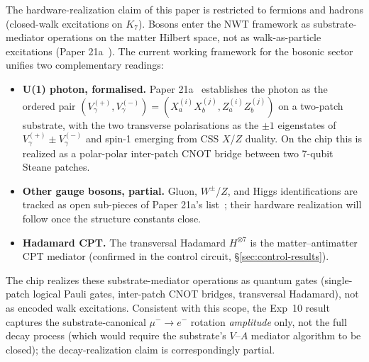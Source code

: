 \documentclass[11pt]{article}
\begin{document}
The hardware-realization claim of this paper is restricted to fermions and hadrons (closed-walk excitations on $K_7$).  Bosons enter the NWT framework as substrate-mediator operations on the matter Hilbert space, not as walk-as-particle excitations (Paper 21a~\cite[\S 3.6]{Paper21a}).  The current working framework for the bosonic sector unifies two complementary readings:
\begin{itemize}
\item \textbf{U(1) photon, formalised.}  Paper 21a~\cite[\S 3.6, \S 9.3]{Paper21a} establishes the photon as the ordered pair $(V_\gamma^{(+)}, V_\gamma^{(-)}) = (X_a^{(i)} X_b^{(j)}, Z_a^{(i)} Z_b^{(j)})$ on a two-patch substrate, with the two transverse polarisations as the $\pm 1$ eigenstates of $V_\gamma^{(+)} \pm V_\gamma^{(-)}$ and spin-1 emerging from CSS $X$/$Z$ duality.  On the chip this is realized as a polar-polar inter-patch CNOT bridge between two 7-qubit Steane patches.
\item \textbf{Other gauge bosons, partial.}  Gluon, $W^\pm$/$Z$, and Higgs identifications are tracked as open sub-pieces of Paper 21a's list~\cite[\S 9.3]{Paper21a}; their hardware realization will follow once the structure constants close.
\item \textbf{Hadamard CPT.}  The transversal Hadamard $H^{\otimes 7}$ is the matter--antimatter CPT mediator (confirmed in the control circuit, \S\ref{sec:control-results}).
\end{itemize}
The chip realizes these substrate-mediator operations as quantum gates (single-patch logical Pauli gates, inter-patch CNOT bridges, transversal Hadamard), not as encoded walk excitations.  Consistent with this scope, the Exp~10 result captures the substrate-canonical $\mu^- \to e^-$ rotation \emph{amplitude} only, not the full decay process (which would require the substrate's $V$--$A$ mediator algorithm to be closed); the decay-realization claim is correspondingly partial.
\end{document}

